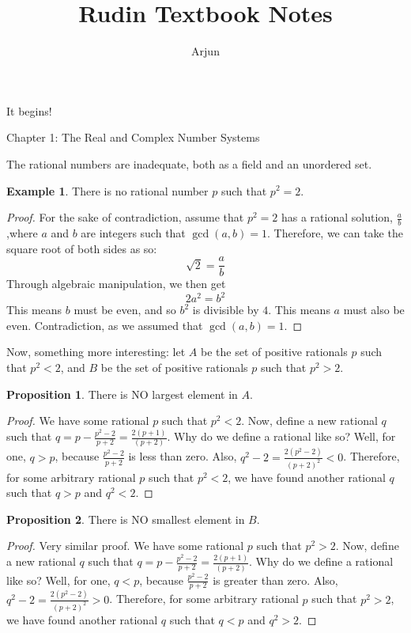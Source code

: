 \documentclass{article}
\title{Rudin Textbook Notes}
\author{Arjun}
\theoremstyle{definition}
\newtheorem{exmp}{Example}[section]
\newtheorem{prop}{Proposition}[section]
\begin{document}
\maketitle
\begin{center}
 It begins!
 \end{center}
 \newpage
\begin{center}
 Chapter 1: The Real and Complex Number Systems
 \end{center}
 
 \begin{section}
 \noindent The rational numbers are inadequate, both as a field and an unordered set.
 \begin{exmp}
There is no rational number $p$ such that $p^2 = 2$.
\end{exmp}


\begin{proof}
For the sake of contradiction, assume that $p^2 = 2$ has a rational solution, $\frac{a}{b}$ ,where $a$ and $b$ are integers such that $\gcd (a,b) = 1$. Therefore, we can take the square root of both sides as so: 
\[ \sqrt{2} = \frac{a}{b} \]
Through algebraic manipulation, we then get 
\[ 2a^2 = b^2 \]
This means $b$ must be even, and so $b^2$ is divisible by $4$. This means $a$ must also be even. Contradiction, as we assumed that $\gcd (a,b) = 1$.
\end{proof}

\noindent Now, something more interesting: let $A$ be the set of positive rationals $p$ such that $p^2 < 2$, and $B$ be the set of positive rationals $p$ such that $p^2 > 2$.

\begin{prop}
There is NO largest element in $A$.
\end{prop}
\begin{proof}
We have some rational $p$ such that $p^2 < 2$. Now, define a new rational $q$ such that $q = p - \frac{p^2-2}{p+2} = \frac{2(p+1)}{(p+2)}$. Why do we define a rational like so? Well, for one, $q > p$, because $\frac{p^2-2}{p+2}$ is less than zero. Also, $q^2 - 2 = \frac{2(p^2-2)}{(p+2)^2} < 0$. Therefore, for some arbitrary rational $p$ such that $p^2 < 2$, we have found another rational $q$ such that $q > p$ and $q^2 < 2$.
\end{proof}

\begin{prop}
There is NO smallest element in $B$.
\end{prop}
\begin{proof}
Very similar proof. We have some rational $p$ such that $p^2 > 2$. Now, define a new rational $q$ such that $q = p - \frac{p^2-2}{p+2} = \frac{2(p+1)}{(p+2)}$. Why do we define a rational like so? Well, for one, $q < p$, because $\frac{p^2-2}{p+2}$ is greater than zero. Also, $q^2 - 2 = \frac{2(p^2-2)}{(p+2)^2} > 0$. Therefore, for some arbitrary rational $p$ such that $p^2 > 2$, we have found another rational $q$ such that $q < p$ and $q^2 > 2$.
\end{proof}


\end{section}
\end{document}
